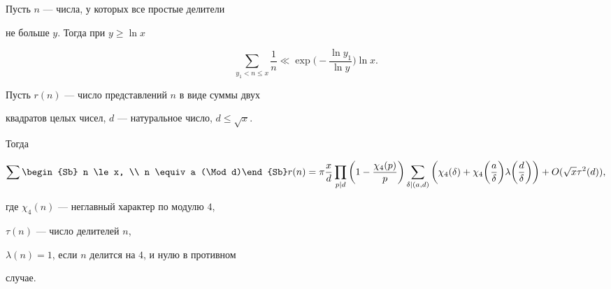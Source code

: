\begin{lem}


\label{har-lit3}


Пусть $n$ --- числа, у которых все простые делители


не больше $y$. Тогда при $y \ge \ln x$


$$


\sum_{y_1 < n \le x} \frac1{n} \ll \exp \bigg( -


\frac{\ln y_1}{\ln y} \bigg) \ln x.


$$


\end{lem}





\begin{lem}


\label{har-lit5}


Пусть $r(n)$ --- число представлений $n$ в виде суммы двух


квадратов целых чисел, $d$ --- натуральное число, $d \le \sqrt x$.


Тогда


$$


\sum\begin{Sb} n \le x, \\ n \equiv a (\Mod d)\end{Sb} r(n)


= \pi \frac{x}{d} \prod_{p|d} \bigg(1 - \frac{\chi_4(p)}{p}


\bigg) \sum_{\delta | (a,d)} \bigg( \chi_4(\delta) + \chi_4


\bigg ( \frac{a}{\delta} \bigg) \lambda \bigg(


\frac{d}{\delta} \bigg)\bigg )


+ O(\sqrt x \tau^2(d)),


$$


где $\chi_4(n)$ --- неглавный характер по модулю $4$,


$\tau(n)$ --- число делителей $n$,


$\lambda (n) = 1$, если $n$ делится на $4$, и нулю в противном


случае.


\end{lem}





